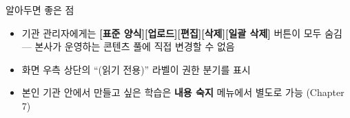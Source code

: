 \begin{tipbox}{알아두면 좋은 점}
\begin{itemize}[leftmargin=1.2em]
  \item 기관 관리자에게는 \textbf{[표준 양식][업로드][편집][삭제][일괄 삭제]} 버튼이 모두 숨김 — 본사가 운영하는 콘텐츠 풀에 직접 변경할 수 없음
  \item 화면 우측 상단의 ``(읽기 전용)'' 라벨이 권한 분기를 표시
  \item 본인 기관 안에서 만들고 싶은 학습은 \textbf{내용 숙지} 메뉴에서 별도로 가능 (Chapter 7)
\end{itemize}
\end{tipbox}
